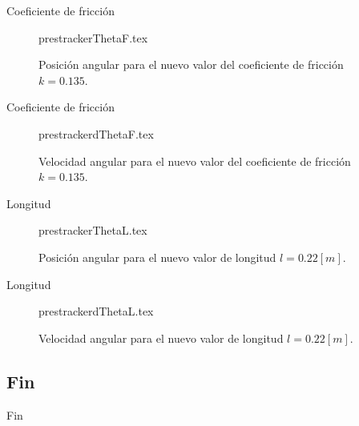 \documentclass{beamer}
\begin{document}
\begin{frame}{Coeficiente de fricción}
 \begin{figure}[htb!]
 \centering
{prestrackerThetaF.tex}
 \caption{Posición angular para el nuevo valor del coeficiente de fricción $k = 0.135$.}
 \label{fig: time tracker theta friction}
\end{figure}
\end{frame}

\begin{frame}{Coeficiente de fricción}
 \begin{figure}[htb!]
 \centering
{prestrackerdThetaF.tex}
 \caption{Velocidad angular para el nuevo valor del coeficiente de fricción $k = 0.135$.}
 \label{fig: time tracker dtheta friction}
\end{figure}
\end{frame}

\begin{frame}{Longitud}
 \begin{figure}[htb!]
 \centering
{prestrackerThetaL.tex}
 \caption{Posición angular para el nuevo valor de longitud $l = 0.22 [m]$.}
 \label{fig: time tracker theta new length}
\end{figure}
\end{frame}

\begin{frame}{Longitud}
 \begin{figure}[htb!]
 \centering
{prestrackerdThetaL.tex}
 \caption{Velocidad angular para el nuevo valor de longitud $l = 0.22 [m]$.}
 \label{fig: time tracker dtheta new length}
\end{figure}
\end{frame}


\subsection*{Fin}
\begin{frame}{Fin}
 
\end{frame}
\end{document}
